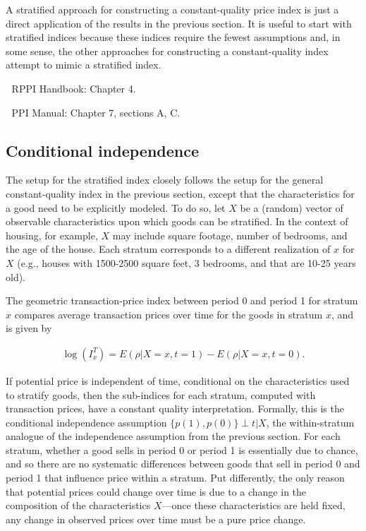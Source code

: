 \documentclass[]{article}
\begin{document}
A stratified approach for constructing a constant-quality price index is just a direct application of the results in the previous section. It is useful to start with stratified indices because these indices require the fewest assumptions and, in some sense, the other approaches for constructing a constant-quality index attempt to mimic a stratified index.

📖 RPPI Handbook: Chapter 4.

📖 PPI Manual: Chapter 7, sections A, C.

\hypertarget{conditional-independence}{%
\subsection{Conditional independence}\label{conditional-independence}}

The setup for the stratified index closely follows the setup for the general constant-quality index in the previous section, except that the characteristics for a good need to be explicitly modeled. To do so, let \(X\) be a (random) vector of observable characteristics upon which goods can be stratified. In the context of housing, for example, \(X\) may include square footage, number of bedrooms, and the age of the house. Each stratum corresponds to a different realization of \(x\) for \(X\) (e.g., houses with 1500-2500 square feet, 3 bedrooms, and that are 10-25 years old).

The geometric transaction-price index between period 0 and period 1 for stratum \(x\) compares average transaction prices over time for the goods in stratum \(x\), and is given by

\begin{align*}
\log(I^{T}_{x}) = E(\rho | X = x, t = 1) - E(\rho | X = x, t = 0).
\end{align*}

If potential price is independent of time, conditional on the characteristics used to stratify goods, then the sub-indices for each stratum, computed with transaction prices, have a constant quality interpretation. Formally, this is the conditional independence assumption \(\{p(1), p(0)\} \perp t | X\), the within-stratum analogue of the independence assumption from the previous section. For each stratum, whether a good sells in period 0 or period 1 is essentially due to chance, and so there are no systematic differences between goods that sell in period 0 and period 1 that influence price within a stratum. Put differently, the only reason that potential prices could change over time is due to a change in the composition of the
characteristics \(X\)---once these characteristics are held fixed, any change in observed prices over time must be a pure price change.
\end{document}

